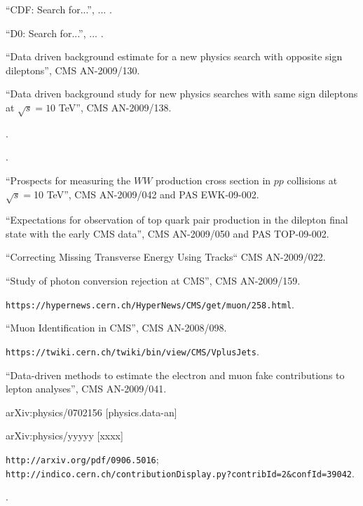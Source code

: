 \begin{thebibliography}{99}

 {``CDF: Search for...''}, ... .

 {``D0: Search for...''}, ... .

 {``Data driven background estimate for a new physics search with opposite sign dileptons''}, CMS AN-2009/130.

 {``Data driven background study for new physics searches with same sign dileptons at $\sqrt{s} = 10 $ TeV''}, CMS AN-2009/138.

.

.

 {``Prospects for measuring the $WW$ production cross section in $pp$ collisions at $\sqrt s = $10 TeV''}, CMS AN-2009/042 and PAS EWK-09-002.

 {``Expectations for observation of top quark pair production in the dilepton final state with the early CMS data''}, CMS AN-2009/050 and PAS TOP-09-002.

 {``Correcting Missing Transverse Energy Using Tracks``} CMS AN-2009/022.

 {``Study of photon conversion rejection at CMS''}, CMS AN-2009/159.

 {\tt https://hypernews.cern.ch/HyperNews/CMS/get/muon/258.html}.

 {``Muon Identification in CMS''}, CMS AN-2008/098.

 {\tt https://twiki.cern.ch/twiki/bin/view/CMS/VplusJets}.

 {``Data-driven methods to estimate the electron and muon fake contributions to lepton analyses''}, CMS AN-2009/041.

 arXiv:physics/0702156 [physics.data-an]

 arXiv:physics/yyyyy [xxxx]

 {\tt http://arxiv.org/pdf/0906.5016}; \\
{\tt http://indico.cern.ch/contributionDisplay.py?contribId=2\&confId=39042}.

.



\end{thebibliography}
